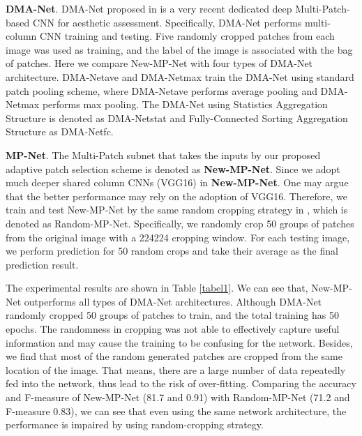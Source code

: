 \documentclass[10pt,twocolumn,letterpaper]{article}
\begin{document}
	\textbf{DMA-Net}. DMA-Net proposed in \cite{Lu:2015:ICCV} is a very recent dedicated deep Multi-Patch-based CNN for aesthetic assessment.
	Specifically, DMA-Net performs multi-column CNN training and testing. Five randomly cropped patches from each image was used as training, and the label of the image is associated with the bag of patches. Here we compare New-MP-Net with four types of DMA-Net architecture. DMA-Net{\tiny ave} and DMA-Net{\tiny max} train the DMA-Net using standard patch pooling scheme, where DMA-Net{\tiny ave} performs average pooling and DMA-Net{\tiny max} performs max pooling. The DMA-Net using Statistics Aggregation Structure is denoted as DMA-Net{\tiny stat} and Fully-Connected Sorting Aggregation Structure as DMA-Net{\tiny fc}. 
	
	\textbf{MP-Net}. The Multi-Patch subnet that takes the inputs by our proposed adaptive patch selection scheme is denoted as \textbf{New-MP-Net}. Since we adopt much deeper shared column CNNs (VGG16)  in \textbf{New-MP-Net}. One may argue that the better performance may rely on the adoption of VGG16. Therefore, we train and test New-MP-Net by the same random cropping strategy in \cite{Lu:2015:ICCV}, which is denoted as Random-MP-Net. Specifically, we randomly crop 50 groups of patches from the original image with a 224224 cropping window. For each testing image, we perform prediction for 50 random crops and take their average as the final prediction result. 
	
	The experimental results are shown in Table \ref{tabel1}. We can see that, New-MP-Net outperforms all types of DMA-Net architectures.
	Although DMA-Net randomly cropped 50 groups of patches to train, and the total training has 50 epochs. The randomness in cropping was not able to effectively capture useful information and may cause the training to be confusing for the network. Besides, we find that most of the random generated patches are cropped from the same location of the image. That means, there are a large number of data repeatedly fed into the network, thus lead to the risk of over-fitting. Comparing the accuracy and F-measure of New-MP-Net (81.7 and 0.91) with Random-MP-Net (71.2 and F-measure 0.83), we can see that even using the same network architecture, the performance is impaired by using random-cropping strategy.
	
\end{document}
